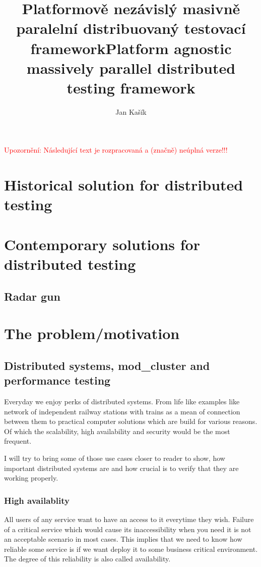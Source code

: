 \documentclass[
  master,
  biblatex,
  glossaries,
  index
]{kidiplom}
\title{Platformově nezávislý masivně paralelní distribuovaný testovací framework}
\title[english]{Platform agnostic massively parallel distributed testing framework}
\author{Jan Kašík}
\begin{document}
\maketitle

\noindent\textcolor{red}{\LARGE Upozornění: Následující text je rozpracovaná a (značně) neúplná verze!!!}

\section{Historical solution for distributed testing}

\section{Contemporary solutions for distributed testing}

\subsection{Radar gun}

\section{The problem/motivation}

\subsection{Distributed systems, mod\_cluster and performance testing}


Everyday we enjoy perks of distributed systems. From life like examples like network of independent railway stations with trains as a mean of connection between them to practical computer solutions which are build for various reasons. Of which the scalability, high availability and security would be the most frequent.

I will try to bring some of those use cases closer to reader to show, how important distributed systems are and how crucial is to verify that they are working properly.

\subsubsection{High availablity}

All users of any service want to have an access to it everytime they wish. Failure of a critical service which would cause its inaccessibility when you need it is not an acceptable scenario in most cases. This implies that we need to know how reliable some service is if we want deploy it to some business critical environment. The degree of this reliability is also called availability.
\end{document}

